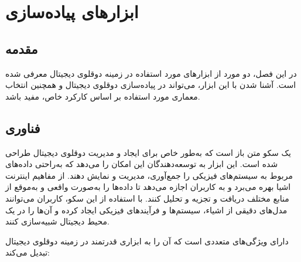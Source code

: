 \chapter{ابزار‌های پیاده‌سازی}

\section{مقدمه}

در این فصل، دو مورد از ابزار‌های مورد استفاده در زمینه دوقلوی دیجیتال معرفی شده است. آشنا شدن با این ابزار، می‌تواند در پیاده‌سازی دوقلوی دیجیتال و همچنین انتخاب معماری مورد استفاده بر اساس کارکرد خاص، مفید باشد.

\section {فناوری }

یک سکو متن باز است که به‌طور خاص برای ایجاد و مدیریت دوقلوی دیجیتال طراحی شده است. این ابزار به توسعه‌دهندگان این امکان را می‌دهد که به‌راحتی داده‌های مربوط به سیستم‌های فیزیکی را جمع‌آوری، مدیریت و نمایش دهند.
 از مفاهیم اینترنت اشیا بهره می‌برد و به کاربران اجازه می‌دهد تا داده‌ها را به‌صورت واقعی و به‌موقع از منابع مختلف دریافت و تجزیه و تحلیل کنند. با استفاده از این سکو، کاربران می‌توانند مدل‌های دقیقی از اشیاء، سیستم‌ها و فرآیندهای فیزیکی ایجاد کرده و آن‌ها را در یک محیط دیجیتال شبیه‌سازی کنند.
 
 دارای ویژگی‌های متعددی است که آن را به ابزاری قدرتمند در زمینه دوقلوی دیجیتال تبدیل می‌کند:
\cite{s_1}
 
